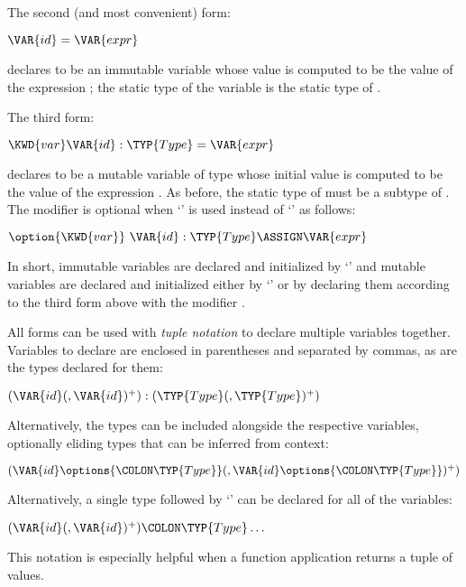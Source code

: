 The second (and most convenient) form:
\begin{Fortress}
\(\VAR{id} = \VAR{expr}\)
\end{Fortress}
declares  to be an immutable variable
whose value is computed to be the value of the expression ;
the static type of the variable is the static type of .

The third form:
\begin{Fortress}
\(\KWD{var} \VAR{id} \mathrel{\mathtt{:}} \TYP{Type} = \VAR{expr}\)
\end{Fortress}
declares  to be a mutable variable of type 
whose initial value is computed to be the value of the expression .
As before, the static type of  must be a subtype of .
The modifier  is optional
when `\EXP{\ASSIGN}' is used instead of `\EXP{=}' as follows:

\begin{Fortress}
\(\option{\KWD{var}}\ \VAR{id} \mathrel{\mathtt{:}} \TYP{Type} \ASSIGN \VAR{expr}\)
\end{Fortress}

In short, immutable variables are declared and initialized by `\EXP{=}'
and mutable variables are declared and initialized either by `\EXP{\ASSIGN}'
or by declaring them according to the third form above with the modifier
.


All forms can be used with \emph{tuple notation} to declare multiple
variables together.  Variables to declare
are enclosed in parentheses and separated by commas, as are the
types declared for them:
\begin{Fortress}
\((\VAR{id}(, \VAR{id})^+) \mathrel{\mathtt{:}} (\TYP{Type}(, \TYP{Type})^+)\)
\end{Fortress}
Alternatively, the types can be included alongside the respective variables,
optionally eliding types that can be inferred from context:
\begin{Fortress}
\((\VAR{id}\options{\COLON \TYP{Type}}(, \VAR{id}\options{\COLON \TYP{Type}})^+)\)
\end{Fortress}

Alternatively, a single type followed by `\EXP{\ldots}'
can be declared for all of the variables:
\begin{Fortress}
\((\VAR{id}(, \VAR{id})^+)\COLON \TYP{Type}\ldots\)
\end{Fortress}
This notation is especially helpful when a function application returns a tuple of values.

